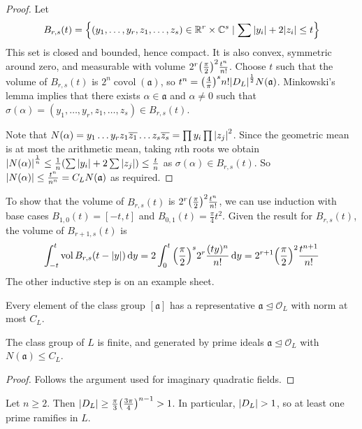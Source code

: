 \begin{proof}
    Let
    \[ B_{r,s}(t) = \qty{(y_1, \dots, y_r, z_1, \dots, z_s) \in \mathbb R^r \times \mathbb C^s \mid \sum \abs{y_i} + 2 \abs{z_i} \leq t} \]
    This set is closed and bounded, hence compact.
    It is also convex, symmetric around zero, and measurable with volume \( 2^r \qty(\frac{\pi}{2})^2 \frac{t^n}{n!} \).
    Choose \( t \) such that the volume of \( B_{r,s}(t) \) is \( 2^n \operatorname{covol}(\mathfrak a) \), so \( t^n = \qty(\frac{4}{\pi})^s n! \abs{D_L}^\frac{1}{2} N(\mathfrak a) \).
    Minkowski's lemma implies that there exists \( \alpha \in \mathfrak a \) and \( \alpha \neq 0 \) such that \( \sigma(\alpha) = (y_1, \dots, y_r, z_1, \dots, z_s) \in B_{r,s}(t) \).

    Note that \( N(\alpha) = y_1 \dots y_r z_1 \overline{z_1} \dots z_s \overline{z_s} = \prod y_i \prod \abs{z_j}^2 \).
    Since the geometric mean is at most the arithmetic mean, taking \( n \)th roots we obtain \( \abs{N(\alpha)}^{\frac{1}{n}} \leq \frac{1}{n}\qty(\sum \abs{y_i} + 2 \sum \abs{z_j}) \leq \frac{t}{n} \) as \( \sigma(\alpha) \in B_{r,s}(t) \).
    So \( \abs{N(\alpha)} \leq \frac{t^n}{n^n} = C_L N(\mathfrak a) \) as required.
\end{proof}
To show that the volume of \( B_{r,s}(t) \) is \( 2^r \qty(\frac{\pi}{2})^2 \frac{t^n}{n!} \), we can use induction with base cases \( B_{1,0}(t) = [-t,t] \) and \( B_{0,1}(t) = \frac{\pi}{4} t^2 \).
Given the result for \( B_{r,s}(t) \), the volume of \( B_{r+1,s}(t) \) is
\[ \int_{-t}^t \operatorname{vol} B_{r,s}(t-\abs{y}) \dd{y} = 2\int_0^t \qty(\frac{\pi}{2})^s 2^r \frac{(ty)^n}{n!} \dd{y} = 2^{r+1} \qty(\frac{\pi}{2})^2 \frac{t^{n+1}}{n!} \]
The other inductive step is on an example sheet.
\begin{corollary}
    Every element of the class group \( [\mathfrak a] \) has a representative \( \mathfrak a \trianglelefteq \mathcal O_L \) with norm at most \( C_L \).
\end{corollary}
\begin{theorem}
    The class group of \( L \) is finite, and generated by prime ideals \( \mathfrak a \trianglelefteq \mathcal O_L \) with \( N(\mathfrak a) \leq C_L \).
\end{theorem}
\begin{proof}
    Follows the argument used for imaginary quadratic fields.
\end{proof}
\begin{theorem}
    Let \( n \geq 2 \).
    Then \( \abs{D_L} \geq \frac{\pi}{3} \qty(\frac{3\pi}{4})^{n-1} > 1 \).
    In particular, \( \abs{D_L} > 1 \), so at least one prime ramifies in \( L \).
\end{theorem}
